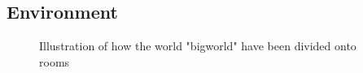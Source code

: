 \documentclass[../Head/Main.tex]{subfiles}
\begin{document}
\subsection{Environment}

\begin{figure}[H]
	\centering
	
	\caption{Illustration of how the world "bigworld" have been divided onto rooms}
\end{figure}
\end{document}
